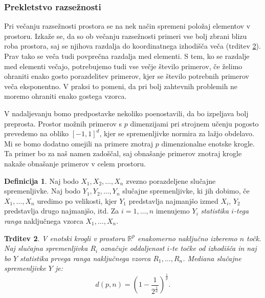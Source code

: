 \documentclass[12pt,a4paper,twoside]{article}
\theoremstyle{definition} %
\newtheorem{definicija}{Definicija}[section]
\theoremstyle{plain} %
\newtheorem{trditev}[definicija]{Trditev}
\numberwithin{equation}{section}  %
\begin{document}

\subsubsection{Prekletstvo razsežnosti}

Pri večanju razsežnosti prostora se na nek način spremeni položaj elementov v prostoru. 
Izkaže se, da so ob večanju razsežnosti primeri vse bolj zbrani blizu roba prostora, saj se njihova razdalja do koordinatnega izhodišča veča (trditev \ref{trd:prekletstvo_dim}). 
Prav tako se veča tudi povprečna razdalja med elementi. %
S tem, ko se razdalje med elementi večajo, potrebujemo tudi vse večje število primerov, če želimo ohraniti enako gosto porazdelitev primerov, kjer se število potrebnih primerov veča eksponentno. 
V praksi to pomeni, da pri bolj zahtevnih problemih ne moremo ohraniti enako gostega vzorca. 

V nadaljevanju bomo predpostavke nekoliko poenostavili, da bo izpeljava bolj preprosta. 
Prostor možnih primerov s $p$ dimenzijami pri strojnem učenju pogosto prevedemo na obliko $[-1, 1]^d$, kjer se spremenljivke normira za lažjo obdelavo. 
Mi se bomo dodatno omejili na primere znotraj $p$ dimenzionalne enotske krogle. 
Ta primer bo za naš namen zadoščal, saj obnašanje primerov znotraj krogle nakaže obnašanje primerov v celem prostoru.


\begin{definicija}
\label{def:statistika}
	Naj bodo $X_1, X_2, \ldots, X_n$ zvezno porazdeljene slučajne spremenljivke.
	Naj bodo $Y_1, Y_2, \ldots, Y_n$ slučajne spremenljivke, ki jih dobimo, če $X_1, \ldots, X_n$ uredimo po velikosti, kjer $Y_1$ predstavlja najmanjšo izmed $X_i$, $Y_2$ predstavlja drugo najmanjšo, itd.
	Za $i=1,\ldots,n$ imenujemo $Y_i$ \emph{statistika $i$-tega ranga} naključnega vzorca $X_1, \ldots, X_n$.
\end{definicija}

\begin{trditev}
\label{trd:prekletstvo_dim}
	V enotski krogli v prostoru $\mathbb{R}^p$ enakomerno naključno izberemo $n$ točk.
	Naj slučajna spremenljivka $R_i$ označuje oddaljenost $i$-te točke od izhodišča in naj bo $Y$ statistika prvega ranga naključnega vzorca $R_1, \ldots, R_n$. %
	Mediana slučajne spremenljivke $Y$ je:
	\[
		d(p,n) = (1 - \frac{1}{2^{\frac{1}{n}}})^{\frac{1}{p}}.
	\]
\end{trditev}
\end{document}
